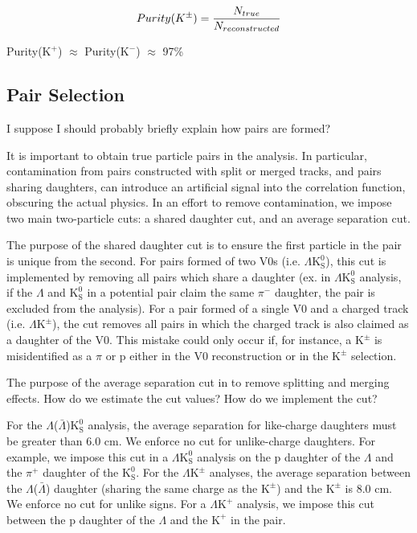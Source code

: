 \documentclass[ALICE,manyauthors]{cernphprep}
\newcommand{\Lam}{$\Lambda$\xspace}
\newcommand{\LamALam}{$\Lambda$($\bar{\Lambda}$)\xspace}
\newcommand{\KchP}{$\mathrm{K^{+}}$\xspace}
\newcommand{\KchM}{$\mathrm{K^{-}}$\xspace}
\newcommand{\Kpm}{$\mathrm{K^{\pm}}$\xspace}
\newcommand{\Ks}{$\mathrm{K^{0}_{S}}$\xspace}
\newcommand{\LamKchP}{$\Lambda\mathrm{K^{+}}$\xspace}
\newcommand{\LamKpm}{$\Lambda\mathrm{K^{\pm}}$\xspace}
\newcommand{\LamKs}{$\Lambda\mathrm{K^{0}_{S}}$\xspace}
\newcommand{\LamALamKs}{$\Lambda$($\bar{\Lambda}$)$\mathrm{K^{0}_{S}}$\xspace}
\begin{document}
\begin{equation}
 Purity(K^{\pm}) = \frac{N_{true}}{N_{reconstructed}} \\
\label{eqn:KchPurity}
\end{equation}

Purity(\KchP) $\approx$ Purity(\KchM) $\approx$ 97\%


\subsection{Pair Selection}
\label{PairSelection}
I suppose I should probably briefly explain how pairs are formed?

It is important to obtain true particle pairs in the analysis.  In particular, contamination from pairs constructed with split or merged tracks, and pairs sharing daughters, can introduce an artificial signal into the correlation function, obscuring the actual physics.  In an effort to remove contamination, we impose two main two-particle cuts: a shared daughter cut, and an average separation cut.  

The purpose of the shared daughter cut is to ensure the first particle in the pair is unique from the second.  For pairs formed of two V0s (i.e. \LamKs), this cut is implemented by removing all pairs which share a daughter (ex. in \LamKs analysis, if the \Lam and \Ks in a potential pair claim the same $\pi^{-}$ daughter, the pair is excluded from the analysis).  For a pair formed of a single V0 and a charged track (i.e. \LamKpm), the cut removes all pairs in which the charged track is also claimed as a daughter of the V0.  This mistake could only occur if, for instance, a \Kpm is misidentified as a $\pi$ or p either in the V0 reconstruction or in the \Kpm selection.

The purpose of the average separation cut in to remove splitting and merging effects.  How do we estimate the cut values?  How do we implement the cut?

For the \LamALamKs analysis, the average separation for like-charge daughters must be greater than 6.0 cm.  We enforce no cut for unlike-charge daughters.  For example, we impose this cut in a \LamKs analysis on the p daughter of the \Lam and the $\pi^{+}$ daughter of the \Ks.  For the \LamKpm analyses, the average separation between the \LamALam daughter (sharing the same charge as the \Kpm) and the \Kpm is 8.0 cm.  We enforce no cut for unlike signs.  For a \LamKchP analysis, we impose this cut between the p daughter of the \Lam and the \KchP in the pair.
\end{document}
